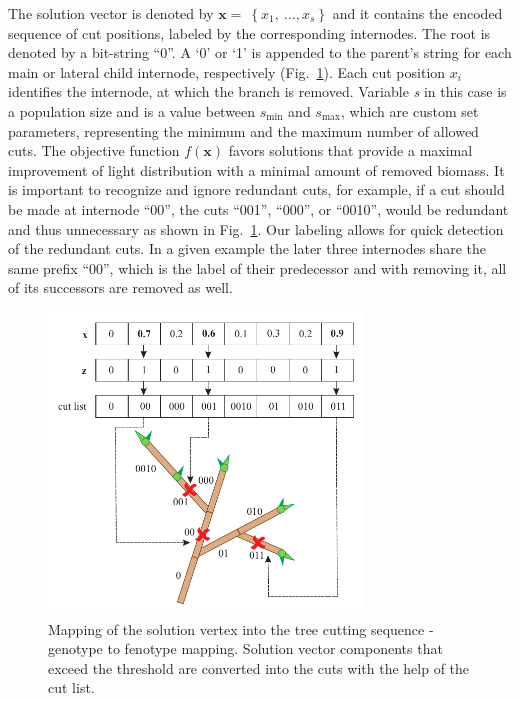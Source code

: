 The solution vector is denoted by
\(\mathbf{x} = \ \left\{ x_{1},\ \ldots,x_{s} \right\}\) and it contains
the encoded sequence of cut positions, labeled by the corresponding
internodes. The root is denoted by a bit-string ``0''. A `0' or `1' is
appended to the parent's string for each main or lateral child
internode, respectively (Fig.~\ref{fig:my_figure2}). Each cut position \(x_{i}\)
identifies the internode, at which the branch is removed. Variable
\emph{s} in this case is a population size and is a value between
\(s_{\mathrm{\min}}\) and \(s_{\mathrm{\max}}\), which are custom set
parameters, representing the minimum and the maximum number of allowed
cuts. The objective function \(f(\mathbf{x})\) favors solutions that
provide a maximal improvement of light distribution with a minimal amount
of removed biomass. It is important to recognize and ignore redundant cuts,
for example, if a cut should be made at internode ``00'', the cuts
``001'', ``000'', or ``0010'', would be redundant and thus unnecessary
as shown in Fig.~\ref{fig:my_figure2}. Our labeling allows for quick detection of the
redundant cuts. In a given example the later three internodes share the
same prefix ``00'', which is the label of their predecessor and with
removing it, all of its successors are removed as well.
\begin{figure}[!t]
    \centering
    \includegraphics[width=3.3in]{figs/Fig2.pdf}
    \caption{Mapping of the solution vertex into the tree cutting
sequence - genotype to fenotype mapping. Solution vector components that exceed the threshold are converted into the cuts with the help of the cut list.}
    \label{fig:my_figure2}
\end{figure}

